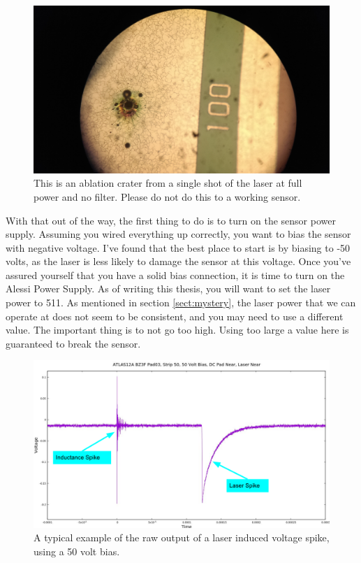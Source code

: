 \documentclass{report}
\begin{document}
            \begin{figure}[h] 
                \includegraphics[height=.4\textheight]{crater}
                \centering
                \caption{ This is an ablation crater from a single shot of the laser at full power and no filter. Please do not do this to a working sensor. }
                \label{fig:crater}
            \end{figure}

            With that out of the way, the first thing to do is to turn on the sensor power supply. Assuming you wired everything up correctly, you want to bias the sensor with negative voltage. I've found that the best place to start is by biasing to -50 volts, as the laser is less likely to damage the sensor at this voltage. Once you've assured yourself that you have a solid bias connection, it is time to turn on the Alessi Power Supply. As of writing this thesis, you will want to set the laser power to 511. As mentioned in section \ref{sect:mystery}, the laser power that we can operate at does not seem to be consistent, and you may need to use a different value. The important thing is to not go too high. Using too large a value here is guaranteed to break the sensor.

            \begin{figure}[h] 
                \includegraphics[height=.4\textheight]{50V_spike}
                \centering
                \caption{ A typical example of the raw output of a laser induced voltage spike, using a 50 volt bias. }
                \label{fig:50V_spike}
            \end{figure}
\end{document}
